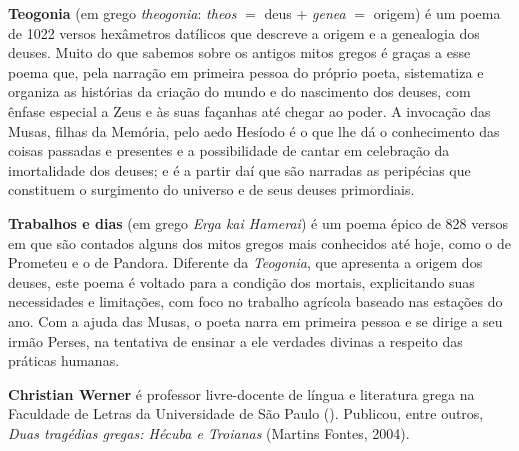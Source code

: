 \textbf{Teogonia} (em grego \textit{theogonia}: \textit{theos} $=$ deus +
\textit{genea} $=$ origem) é um poema de 1022 versos hexâmetros datílicos que
descreve a origem e a genealogia dos deuses. Muito do que sabemos sobre os
antigos mitos gregos é graças a esse poema que, pela narração em primeira
pessoa do próprio poeta, sistematiza e organiza as histórias da criação do
mundo e do nascimento dos deuses, com ênfase especial a Zeus e às suas façanhas
até chegar ao poder. A invocação das Musas, filhas da Memória, pelo aedo
Hesíodo é o que lhe dá o conhecimento das coisas passadas e presentes e a
possibilidade de cantar em celebração da imortalidade dos deuses; e é a partir
daí que são narradas as peripécias que constituem o surgimento do universo e de
seus deuses primordiais.  


\textbf{Trabalhos e dias} (em grego \textit{Erga kai Hamerai}) é um poema épico
de 828 versos em que são contados alguns dos mitos gregos mais conhecidos até
hoje, como o de Prometeu e o de Pandora. Diferente da \textit{Teogonia}, que
apresenta a origem dos deuses, este poema é voltado para a condição dos
mortais, explicitando suas necessidades e limitações, com foco no trabalho
agrícola baseado nas estações do ano. Com a ajuda das Musas, o poeta narra em
primeira pessoa e se dirige a seu irmão Perses, na tentativa de ensinar a ele
verdades divinas a respeito das práticas humanas.


\textbf{Christian Werner} é professor livre-docente de língua e literatura
grega na Faculdade de Letras da Universidade de São Paulo ().
Publicou, entre outros, \textit{Duas tragédias gregas: Hécuba e Troianas}
(Martins Fontes, 2004).







